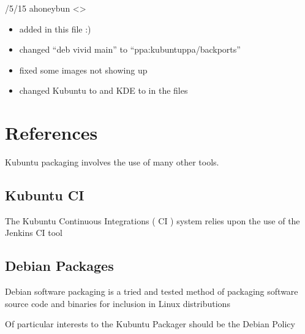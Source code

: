 \documentclass[letterpaper,10pt,english]{sphinxmanual}
\begin{document}
/5/15 \sphinxhyphen{} ahoneybun \textless{}\textgreater{}
\begin{itemize}
\item {} 
\sphinxAtStartPar
added in this file :)

\item {} 
\sphinxAtStartPar
changed “deb  vivid main” to “ppa:kubuntu\sphinxhyphen{}ppa/backports”

\item {} 
\sphinxAtStartPar
fixed some images not showing up

\item {} 
\sphinxAtStartPar
changed Kubuntu to  and KDE to  in the files

\end{itemize}


\section{References}
\label{\detokenize{docs/appendix/references:references}}\label{\detokenize{docs/appendix/references::doc}}
\sphinxAtStartPar
Kubuntu packaging involves the use of many other tools.


\subsection{Kubuntu CI}
\label{\detokenize{docs/appendix/references:kubuntu-ci}}
\sphinxAtStartPar
The Kubuntu Continuous Integrations ( CI ) system relies upon the use of the Jenkins CI tool

\sphinxAtStartPar
{}


\subsection{Debian Packages}
\label{\detokenize{docs/appendix/references:debian-packages}}
\sphinxAtStartPar
Debian software packaging is a tried and tested method of packaging software source code and binaries for inclusion in Linux distributions

\sphinxAtStartPar
Of particular interests to the Kubuntu Packager should be the Debian Policy

\sphinxAtStartPar
{}
\end{document}

